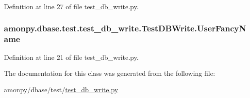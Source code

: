 Definition at line 27 of file test\-\_\-db\-\_\-write.\-py.

\hypertarget{classamonpy_1_1dbase_1_1test_1_1test__db__write_1_1_test_d_b_write_ab23c3c078c9ef84ff80e595d0906cd83}{
\subsubsection[{User\-Fancy\-Name}]{\setlength{\rightskip}{0pt plus 5cm}amonpy.\-dbase.\-test.\-test\-\_\-db\-\_\-write.\-Test\-D\-B\-Write.\-User\-Fancy\-Name}}\label{classamonpy_1_1dbase_1_1test_1_1test__db__write_1_1_test_d_b_write_ab23c3c078c9ef84ff80e595d0906cd83}


Definition at line 21 of file test\-\_\-db\-\_\-write.\-py.



The documentation for this class was generated from the following file\-:\begin{DoxyCompactItemize}
\item 
amonpy/dbase/test/\hyperlink{test__db__write_8py}{test\-\_\-db\-\_\-write.\-py}\end{DoxyCompactItemize}

